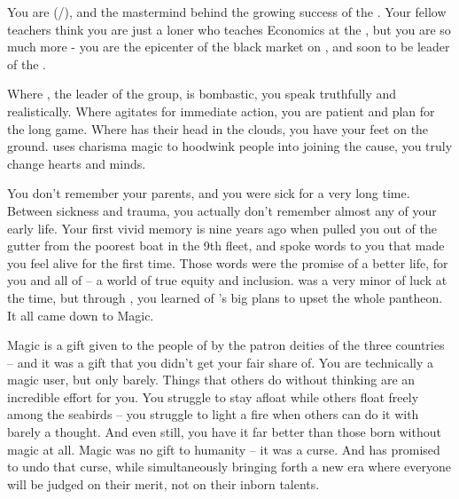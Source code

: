 \documentclass[char]{GL2020}
\begin{document}
\name{\cChupSecond{}}

You are \cChupSecond{\full} (\cChupSecond{\they}/\cChupSecond{\them}), and the mastermind behind the growing success of the \pGoaties{}. Your fellow teachers think you are just a loner who teaches Economics at the \pSchool{}, but you are so much more - you are the epicenter of the black market on \pEarth{}, and soon to be leader of the \pGoaties{}.

Where \cChupLeader{}, the leader of the group, is bombastic, you speak truthfully and realistically. Where \cChupLeader{} agitates for immediate action, you are patient and plan for the long game. Where \cChupLeader{} has their head in the clouds, you have your feet on the ground. \cChupLeader{} uses charisma magic to hoodwink people into joining the cause, you truly change hearts and minds.

You don’t remember your parents, and you were sick for a very long time. Between sickness and trauma, you actually don’t remember almost any of your early life. Your first vivid memory is nine years ago when \cChupLeader{} pulled you out of the gutter from the poorest boat in the 9th fleet, and spoke words to you that made you feel alive for the first time. Those words were the promise of a better life, for you and all of \pEarth{} -- a world of true equity and inclusion. \cGenesis{} was a very minor \cGenesis{\God} of luck at the time, but through \cChupLeader{}, you learned of \cGenesis{}’s big plans to upset the whole pantheon. It all came down to Magic. 

Magic is a gift given to the people of \pEarth{} by the patron deities of the three countries -- and it was a gift that you didn’t get your fair share of. You are technically a magic user, but only barely. Things that others do without thinking are an incredible effort for you. You struggle to stay afloat while others float freely among the seabirds -- you struggle to light a fire when others can do it with barely a thought. And even still, you have it far better than those born without magic at all. Magic was no gift to humanity -- it was a curse. And \cGenesis{} has promised to undo that curse, while simultaneously bringing forth a new era where everyone will be judged on their merit, not on their inborn talents.
\end{document}
